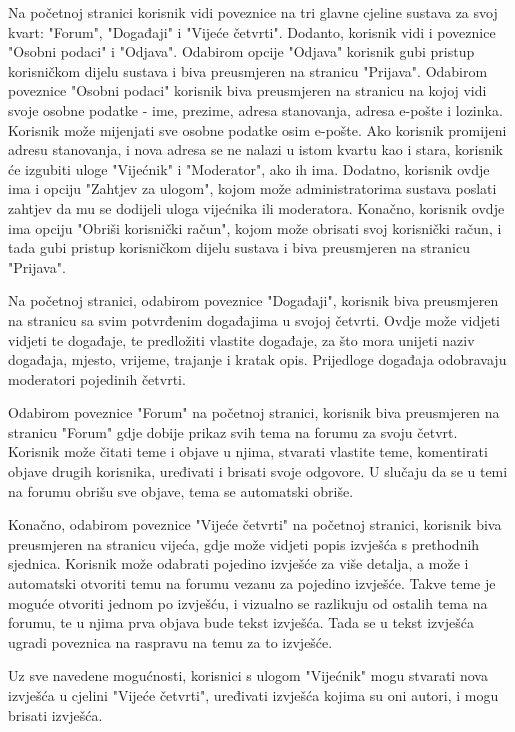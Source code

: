 	Na početnoj stranici korisnik vidi poveznice na tri glavne cjeline sustava za svoj kvart: "Forum", "Događaji" i "Vijeće četvrti". Dodanto, korisnik vidi i poveznice "Osobni podaci" i "Odjava". Odabirom opcije "Odjava" korisnik gubi pristup korisničkom dijelu sustava i biva preusmjeren na stranicu "Prijava". Odabirom poveznice "Osobni podaci" korisnik biva preusmjeren na stranicu na kojoj vidi svoje osobne podatke - ime, prezime, adresa stanovanja, adresa e-pošte i lozinka. Korisnik može mijenjati sve osobne podatke osim e-pošte. Ako korisnik promijeni adresu stanovanja, i nova adresa se ne nalazi u istom kvartu kao i stara, korisnik će izgubiti uloge "Vijećnik" i "Moderator", ako ih ima. Dodatno, korisnik ovdje ima i opciju "Zahtjev za ulogom", kojom može administratorima sustava poslati zahtjev da mu se dodijeli uloga vijećnika ili moderatora. Konačno, korisnik ovdje ima opciju "Obriši korisnički račun", kojom može obrisati svoj korisnički račun, i tada gubi pristup korisničkom dijelu sustava i biva preusmjeren na stranicu "Prijava". 
	
	Na početnoj stranici, odabirom poveznice "Događaji", korisnik biva preusmjeren na stranicu sa svim potvrđenim događajima u svojoj četvrti. Ovdje može vidjeti vidjeti te događaje, te predložiti vlastite događaje, za što mora unijeti naziv događaja, mjesto, vrijeme, trajanje i kratak opis. Prijedloge događaja odobravaju moderatori pojedinih četvrti.
	
	Odabirom poveznice "Forum" na početnoj stranici, korisnik biva preusmjeren na stranicu "Forum" gdje dobije prikaz svih tema na forumu za svoju četvrt. Korisnik može čitati teme i objave u njima, stvarati vlastite teme, komentirati objave drugih korisnika, uređivati i brisati svoje odgovore. U slučaju da se u temi na forumu obrišu sve objave, tema se automatski obriše. 
	
	Konačno, odabirom poveznice "Vijeće četvrti" na početnoj stranici, korisnik biva preusmjeren na stranicu vijeća, gdje može vidjeti popis izvješća s prethodnih sjednica. Korisnik može odabrati pojedino izvješće za više detalja, a može i automatski otvoriti temu na forumu vezanu za pojedino izvješće. Takve teme je moguće otvoriti jednom po izvješću, i vizualno se razlikuju od ostalih tema na forumu, te u njima prva objava bude tekst izvješća. Tada se u tekst izvješća ugradi poveznica na raspravu na temu za to izvješće.
	
	Uz sve navedene mogućnosti, korisnici s ulogom "Vijećnik" mogu stvarati nova izvješća u cjelini "Vijeće četvrti", uređivati izvješća kojima su oni autori, i mogu brisati izvješća.
	
